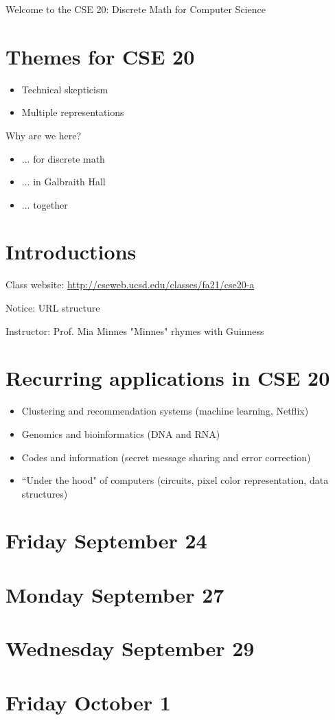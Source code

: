 

Welcome to the CSE 20: Discrete Math for Computer Science

\section*{Themes for CSE 20}
\begin{itemize}
\item Technical skepticism
\item Multiple representations
\end{itemize}

Why are we here?
\begin{itemize}
\item ... for discrete math
\item ... in Galbraith Hall
\item ... together
\end{itemize}

\section*{Introductions}
Class website: \href{http://cseweb.ucsd.edu/classes/fa21/cse20-a}{http://cseweb.ucsd.edu/classes/fa21/cse20-a}

Notice: URL structure

Instructor: Prof. Mia Minnes {\tiny{"Minnes" rhymes with Guinness}}


\section*{Recurring applications in CSE 20}
\begin{itemize}
\item Clustering and recommendation systems (machine learning, Netflix)
\item Genomics and bioinformatics (DNA and RNA)
\item Codes and information (secret message sharing and error correction)
\item ``Under the hood" of computers (circuits, pixel color representation, data structures)
\end{itemize}


\newpage
\section*{Friday September 24}



\newpage
\section*{Monday September 27}


\newpage
\section*{Wednesday September 29}

\newpage
\section*{Friday October 1}

